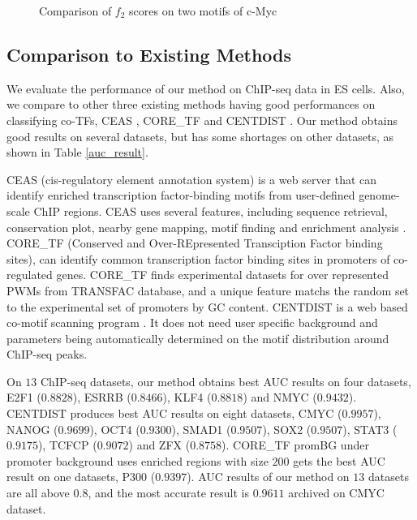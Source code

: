 \documentclass[journal,transmag]{IEEEtran}
\begin{document}
\begin{figure*}[!htpb]
\centering {}
 \hfil \caption{Comparison of $f_2$ scores on two
motifs of c-Myc} \label{f2_dist_bar}
\end{figure*}



\subsection{Comparison to Existing Methods}

We evaluate the performance of our method on ChIP-seq data in ES
cells. Also, we compare to other three existing methods having good
performances on classifying co-TFs, CEAS \cite{mybibfile:ceas},
CORE\_TF \cite{mybibfile:coretf} and CENTDIST
\cite{mybibfile:centdist}. Our method obtains good results on
several datasets, but has some shortages on other datasets, as shown
in Table \ref{auc_result}.


CEAS (cis-regulatory element annotation system)
\cite{mybibfile:ceas} is a web server that can identify enriched
transcription factor-binding motifs from user-defined genome-scale
ChIP regions. CEAS uses several features, including sequence
retrieval, conservation plot, nearby gene mapping, motif finding and
enrichment analysis \cite{mybibfile:ceas}. CORE\_TF (Conserved and
Over-REpresented Transciption Factor binding
sites)\cite{mybibfile:coretf}, can identify common transcription
factor binding sites in promoters of co-regulated genes. CORE\_TF
finds experimental datasets for over represented PWMs from TRANSFAC
database, and a unique feature matchs the random set to the
experimental set of promoters by GC content. CENTDIST is a web based
co-motif scanning program \cite{mybibfile:centdist}. It does not
need user specific background and parameters being automatically
determined on the motif distribution around ChIP-seq peaks.


On $13$ ChIP-seq datasets, our method obtains best AUC results on
four datasets, E2F1 ($0.8828$), ESRRB ($0.8466$), KLF4 ($0.8818$)
and NMYC ($0.9432$). CENTDIST produces best AUC results on eight
datasets, CMYC ($0.9957$), NANOG ($0.9699$), OCT4 ($0.9300$), SMAD1
($0.9507$), SOX2 ($0.9507$), STAT3 ($0.9175$), TCFCP ($0.9072$) and
ZFX ($0.8758$). CORE\_TF promBG under promoter background uses
enriched regions with size $200$ gets the best AUC result on one
datasets, P300 ($0.9397$). AUC results of our method on $13$
datasets are all above $0.8$, and the most accurate result is
$0.9611$ archived on CMYC dataset.
\end{document}
